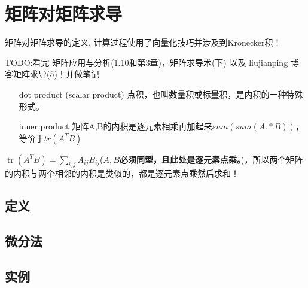     \section{矩阵对矩阵求导}
    矩阵对矩阵求导的定义, 计算过程使用了向量化技巧并涉及到Kronecker积！


    TODO:看完 矩阵应用与分析(1.10和第3章)，矩阵求导术(下) 以及 liujianping 博客矩阵求导(5)！并做笔记
    \\
    \begin{itemize}
        \item[dot product] (scalar product) 点积，也叫数量积或标量积，是内积的一种特殊形式。
        \item[inner product] 矩阵A,B的内积是逐元素相乘再加起来$sum(sum(A.*B))$，等价于$tr(A^T B)$
    \end{itemize}
    $\operatorname{tr}\left(A^{T} B\right)=\sum_{i, j} A_{i j} B_{i j}$(\textbf{$A, B$必须同型，且此处是逐元素点乘。})，所以两个矩阵的内积与两个相邻的内积是类似的，都是逐元素点乘然后求和！
    \subsection{定义}
    \subsection{微分法}
    \subsection{实例}